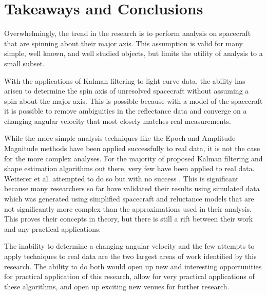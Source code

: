 \documentclass{article}
\begin{document}
\section{Takeaways and Conclusions}

Overwhelmingly, the trend in the research is to perform analysis on spacecraft that are spinning about their major axis. This assumption is valid for many simple, well known, and well studied objects, but limits the utility of analysis to a small subset.

With the applications of Kalman filtering to light curve data, the ability has arisen to determine the spin axis of unresolved spacecraft without assuming a spin about the major axis. This is possible because with a model of the spacecraft it is possible to remove ambiguities in the reflectance data and converge on a changing angular velocity that most closely matches real measurements.

While the more simple analysis techniques like the Epoch and Amplitude-Magnitude methods have been applied successfully to real data, it is not the case for the more complex analyses. For the majority of proposed Kalman filtering and shape estimation algorithms out there, very few have been applied to real data. Wetterer et al. attempted to do so but with no success \cite{AttitudeEstimationFromLightCurve}. This is significant because many researchers so far have validated their results using simulated data which was generated using simplified spacecraft and reluctance models that are not significantly more complex than the approximations used in their analysis. This proves their concepts in theory, but there is still a rift between their work and any practical applications.

The inability to determine a changing angular velocity and the few attempts to apply techniques to real data are the two largest areas of work identified by this research. The ability to do both would open up new and interesting opportunities for practical application of this research, allow for very practical applications of these algorithms, and open up exciting new venues for further research.






\end{document}
